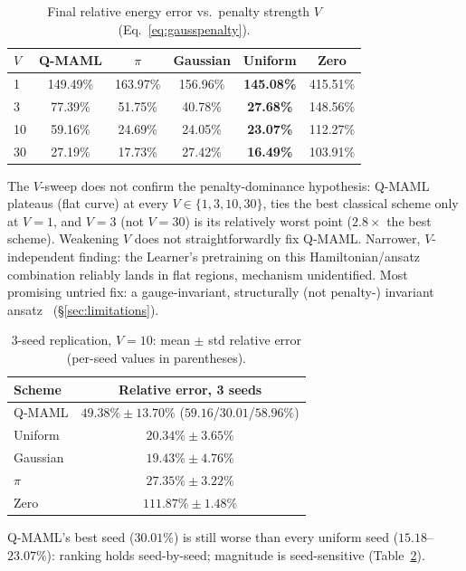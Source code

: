 \documentclass[11pt]{article}
\begin{document}
\begin{table}[ht]
\centering
\caption{Final relative energy error vs.\ penalty strength $V$ (Eq.~\ref{eq:gausspenalty}).}
\label{tab:z2lgt-v}
\begin{tabular}{lccccc}
\toprule
$V$ & Q-MAML & $\pi$ & Gaussian & Uniform & Zero \\
\midrule
1 & 149.49\% & 163.97\% & 156.96\% & \textbf{145.08\%} & 415.51\% \\
3 & 77.39\% & 51.75\% & 40.78\% & \textbf{27.68\%} & 148.56\% \\
10 & 59.16\% & 24.69\% & 24.05\% & \textbf{23.07\%} & 112.27\% \\
30 & 27.19\% & 17.73\% & 27.42\% & \textbf{16.49\%} & 103.91\% \\
\bottomrule
\end{tabular}
\end{table}

The $V$-sweep does not confirm the penalty-dominance hypothesis: Q-MAML plateaus (flat curve) at every
$V\in\{1,3,10,30\}$, ties the best classical scheme only at $V{=}1$, and $V{=}3$ (not $V{=}30$) is its
relatively worst point ($2.8\times$ the best scheme). Weakening $V$ does not straightforwardly fix Q-MAML.
Narrower, $V$-independent finding: the Learner's pretraining on this Hamiltonian/ansatz combination reliably
lands in flat regions, mechanism unidentified. Most promising untried fix: a gauge-invariant, structurally
(not penalty-) invariant ansatz~\citep{z2lgtbp2025} (\S\ref{sec:limitations}).

\begin{table}[ht]
\centering
\caption{3-seed replication, $V{=}10$: mean $\pm$ std relative error (per-seed values in parentheses).}
\label{tab:z2lgt-seeds}
\begin{tabular}{lc}
\toprule
Scheme & Relative error, 3 seeds \\
\midrule
Q-MAML & $49.38\%\pm13.70\%$ ($59.16$/$30.01$/$58.96\%$) \\
Uniform & $20.34\%\pm3.65\%$ \\
Gaussian & $19.43\%\pm4.76\%$ \\
$\pi$ & $27.35\%\pm3.22\%$ \\
Zero & $111.87\%\pm1.48\%$ \\
\bottomrule
\end{tabular}
\end{table}

Q-MAML's best seed ($30.01\%$) is still worse than every uniform seed ($15.18$--$23.07\%$): ranking holds
seed-by-seed; magnitude is seed-sensitive (Table~\ref{tab:z2lgt-seeds}).
\end{document}
